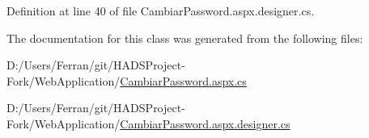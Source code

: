 Definition at line 40 of file Cambiar\+Password.\+aspx.\+designer.\+cs.



The documentation for this class was generated from the following files\+:\begin{DoxyCompactItemize}
\item 
D\+:/\+Users/\+Ferran/git/\+H\+A\+D\+S\+Project-\/\+Fork/\+Web\+Application/\mbox{\hyperlink{CambiarPassword_8aspx_8cs}{Cambiar\+Password.\+aspx.\+cs}}\item 
D\+:/\+Users/\+Ferran/git/\+H\+A\+D\+S\+Project-\/\+Fork/\+Web\+Application/\mbox{\hyperlink{CambiarPassword_8aspx_8designer_8cs}{Cambiar\+Password.\+aspx.\+designer.\+cs}}\end{DoxyCompactItemize}
